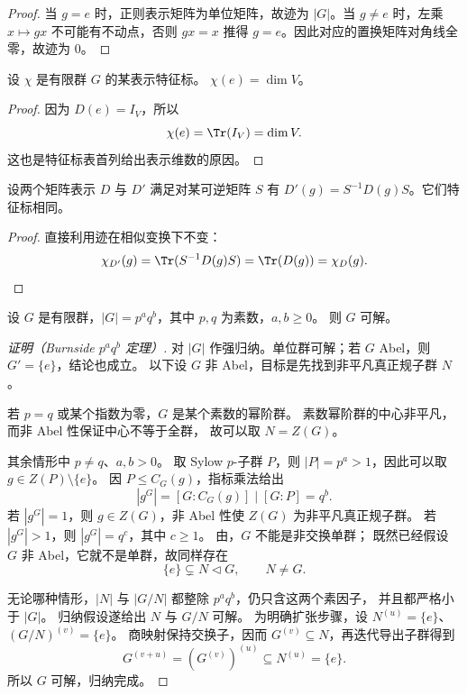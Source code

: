 \begin{proof}
当 $g=e$ 时，正则表示矩阵为单位矩阵，故迹为 $|G|$。当 $g\neq e$ 时，左乘 $x\mapsto gx$ 不可能有不动点，否则 $gx=x$ 推得 $g=e$。因此对应的置换矩阵对角线全零，故迹为 $0$。
\end{proof}

\begin{proposition}
设 $\chi$ 是有限群 $G$ 的某表示特征标。 $\chi(e)=\dim V$。
\end{proposition}

\begin{proof}
因为 $D(e)=I_V$，所以
\[
\chi(e)=\Tr(I_V)=\dim V.
\]
这也是特征标表首列给出表示维数的原因。
\end{proof}

\begin{proposition}
设两个矩阵表示 $D$ 与 $D'$ 满足对某可逆矩阵 $S$ 有 $D'(g)=S^{-1}D(g)S$。它们特征标相同。
\end{proposition}

\begin{proof}
直接利用迹在相似变换下不变：
\[
\chi_{D'}(g)=\Tr(S^{-1}D(g)S)=\Tr(D(g))=\chi_D(g).
\]
\end{proof}

\begin{theorem}[Burnside $p^aq^b$ 定理]
\label{thm:burnside-pa-qb}
设 $G$ 是有限群，$|G|=p^aq^b$，其中 $p,q$ 为素数，$a,b\ge0$。
则 $G$ 可解。
\end{theorem}

\begin{proof}[证明（Burnside $p^aq^b$ 定理）]
对 $|G|$ 作强归纳。单位群可解；若 $G$ Abel，则 $G'=\{e\}$，结论也成立。
以下设 $G$ 非 Abel，目标是先找到非平凡真正规子群 $N$。

若 $p=q$ 或某个指数为零，$G$ 是某个素数的幂阶群。
素数幂阶群的中心非平凡，而非 Abel 性保证中心不等于全群，
故可以取 $N=Z(G)$。

其余情形中 $p\ne q$、$a,b>0$。
取 Sylow $p$-子群 $P$，则 $|P|=p^a>1$，因此可以取
$g\in Z(P)\setminus\{e\}$。
因 $P\le C_G(g)$，指标乘法给出
\[
|g^G|=[G:C_G(g)]\mid[G:P]=q^b.
\]
若 $|g^G|=1$，则 $g\in Z(G)$，非 Abel 性使 $Z(G)$ 为非平凡真正规子群。
若 $|g^G|>1$，则 $|g^G|=q^c$，其中 $c\ge1$。
由，$G$ 不能是非交换单群；
既然已经假设 $G$ 非 Abel，它就不是单群，故同样存在
\[
\{e\}\subsetneq N\lhd G,\qquad N\ne G.
\]

无论哪种情形，$|N|$ 与 $|G/N|$ 都整除 $p^aq^b$，仍只含这两个素因子，
并且都严格小于 $|G|$。
归纳假设遂给出 $N$ 与 $G/N$ 可解。
为明确扩张步骤，设 $N^{(u)}=\{e\}$、$(G/N)^{(v)}=\{e\}$。
商映射保持交换子，因而 $G^{(v)}\subseteq N$，再迭代导出子群得到
\[
G^{(v+u)}=(G^{(v)})^{(u)}\subseteq N^{(u)}=\{e\}.
\]
所以 $G$ 可解，归纳完成。
\end{proof}

